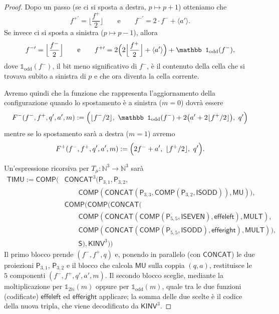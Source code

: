 \begin{proof}
Dopo un passo (se ci si sposta a destra, $p\mapsto p+1$) otteniamo che
\[
f^{+\prime}=\Big\lfloor\frac{f^+}{2}\Big\rfloor
\qquad\text{e}\qquad
f^{-\prime}=2\cdot f^-+\langle a'\rangle.
\]
Se invece ci si sposta a sinistra ($p\mapsto p-1$), allora
\[
f^{-\prime}=\Big\lfloor\frac{f^-}{2}\Big\rfloor
\qquad\text{e}\qquad
f^{+\prime}=2\Bigl(2\Big\lfloor\frac{f^+}{2}\Big\rfloor+\langle a'\rangle\Bigr)+\mathbb 1_{\mathrm{odd}}(f^-),
\]
dove $\mathbb 1_{\mathrm{odd}}(f^-)$, il bit meno significativo di $f^-$, è il contenuto della cella che si trovava subito a sinistra di $p$ e che ora diventa la cella corrente.

Avremo quindi che la funzione che rappresenta l'aggiornamento della configurazione quando lo spostamento è a sinistra ($m=0$) dovrà essere
\[
F^-(f^-,f^+,q',a',m):=\Bigl(\lfloor f^-/2\rfloor,\ \mathbb 1_{\mathrm{odd}}(f^-)+2\bigl(a'+2\lfloor f^+/2\rfloor\bigr),\ q'\Bigr)
\]
mentre se lo spostamento sarà a destra ($m=1$) avremo
\[
F^+(f^-,f^+,q',a',m):=\Bigl(2f^-+a',\ \lfloor f^+/2\rfloor,\ q'\Bigr).
\]

Un'espressione ricorsiva per $T_\mu\colon\mathbb N^3\to\mathbb N^3$ sarà
\begin{align*}
\mathsf{TIMU}:=\mathsf{COMP}\Big(&\mathsf{CONCAT}^3\bigl(\mathsf P_{3,1},\mathsf P_{3,2},\\
&\qquad\mathsf{COMP}(\mathsf{CONCAT}(\mathsf P_{3,3},\mathsf{COMP}(\mathsf P_{3,2},\mathsf{ISODD})),\mathsf{MU})\bigr),\\
&\mathsf{COMP}\Big(\mathsf{COMP}\Big(\mathsf{CONCAT}\Big(\\
&\qquad\mathsf{COMP}(\mathsf{CONCAT}(\mathsf{COMP}(\mathsf P_{5,5},\mathsf{ISEVEN}),\mathsf{effeleft}),\mathsf{MULT}),\\
&\qquad\mathsf{COMP}(\mathsf{CONCAT}(\mathsf{COMP}(\mathsf P_{5,5},\mathsf{ISODD}),\mathsf{efferight}),\mathsf{MULT})\Big),\\
&\qquad\mathsf S\Big),\mathsf{KINV}^3\Big)\Big)
\end{align*}
Il primo blocco prende $(f^-,f^+,q)$ e, ponendo in parallelo (con $\mathsf{CONCAT}$) le due proiezioni $\mathsf P_{3,1}$, $\mathsf P_{3,2}$ e il blocco che calcola $\mathsf{MU}$ sulla coppia $(q,a)$, restituisce le $5$ componenti $(f^-,f^+,q',a',m)$. Il secondo blocco sceglie, mediante la moltiplicazione per $\mathbb 1_{2\mathbb N}(m)$ oppure per $\mathbb 1_{\mathrm{odd}}(m)$, quale tra le due funzioni (codificate) $\mathsf{effeleft}$ ed $\mathsf{efferight}$ applicare; la somma delle due scelte è il codice della nuova tripla, che viene decodificato da $\mathsf{KINV}^3$.


\end{proof}
